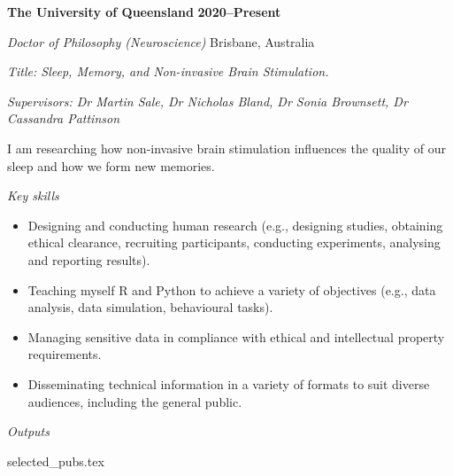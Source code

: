 \textbf{\large The University of Queensland} \hfill \textbf{2020--Present} \par
\vspace{1mm}
\textit{Doctor of Philosophy (Neuroscience)} \hfill Brisbane, Australia\par
\vspace{1mm}
\textit{Title: Sleep, Memory, and Non-invasive Brain Stimulation.}\par
\vspace{1mm}
\textit{Supervisors: Dr Martin Sale, Dr Nicholas Bland, Dr Sonia Brownsett, Dr Cassandra Pattinson}\par
\vspace{1mm}
I am researching how non-invasive brain stimulation influences the quality of our sleep and how we form new memories.\par
\vspace{2mm}
\textit{Key skills} \par
\begin{itemize}
	\item Designing and conducting human research (e.g., designing studies, obtaining ethical clearance, recruiting participants, conducting experiments, analysing and reporting results).
	\item Teaching myself R and Python to achieve a variety of objectives (e.g., data analysis, data simulation, behavioural tasks).
	\item Managing sensitive data in compliance with ethical and intellectual property requirements.
	\item Disseminating technical information in a variety of formats to suit diverse audiences, including the general public.
\end{itemize}\par
\vspace{2mm}
\textit{Outputs}
\begin{enumerate}
	{selected_pubs.tex}
\end{enumerate}\par